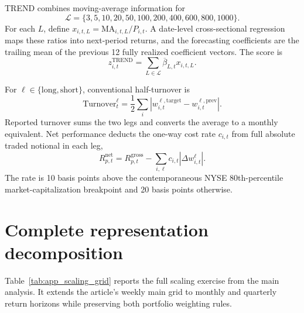 TREND combines moving-average information for
\[
 \mathcal{L}=\{3,5,10,20,50,100,200,400,600,800,1000\}.
\]
For each $L$, define $x_{i,t,L}=\mathrm{MA}_{i,t,L}/P_{i,t}$. A date-level cross-sectional regression maps these ratios into next-period returns, and the forecasting coefficients are the trailing mean of the previous 12 fully realized coefficient vectors. The score is
\begin{equation}
 z^{\mathrm{TREND}}_{i,t}=\sum_{L\in\mathcal{L}}\overline{\beta}_{L,t}x_{i,t,L}.
 \label{eq:app_trend}
\end{equation}

For $\ell\in\{\mathrm{long},\mathrm{short}\}$, conventional half-turnover is
\begin{equation}
 \mathrm{Turnover}^{\ell}_{t}=\frac{1}{2}\sum_i
 \left|w^{\ell,\mathrm{target}}_{i,t}-w^{\ell,\mathrm{prev}}_{i,t}\right|.
 \label{eq:app_turnover}
\end{equation}
Reported turnover sums the two legs and converts the average to a monthly equivalent. Net performance deducts the one-way cost rate $c_{i,t}$ from full absolute traded notional in each leg,
\begin{equation}
 R^{\mathrm{net}}_{p,t}=R^{\mathrm{gross}}_{p,t}
 -\sum_{i,\ell}c_{i,t}\left|\Delta w^{\ell}_{i,t}\right|.
 \label{eq:app_netreturn}
\end{equation}
The rate is 10 basis points above the contemporaneous NYSE 80th-percentile market-capitalization breakpoint and 20 basis points otherwise.

\FloatBarrier

\section{Complete representation decomposition}\label{app:scaling_grid}

Table~\ref{tab:app_scaling_grid} reports the full scaling exercise from the main analysis. It extends the article's weekly main grid to monthly and quarterly return horizons while preserving both portfolio weighting rules.

